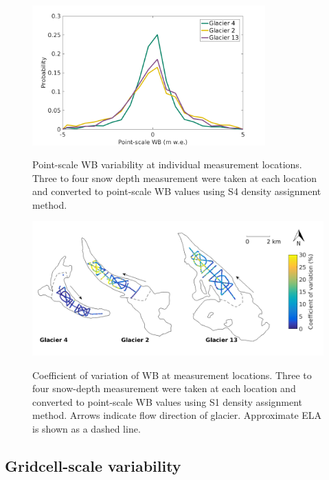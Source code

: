 \documentclass{sfuthesis}
\begin{document}
{\begin{figure}[H]
	\centering
	\includegraphics[width =0.8\textwidth]{SWEvarOneLocHIST.png}\\
	\caption[Point-scale WB variability at individual measurement locations]{Point-scale WB variability at individual measurement locations. Three to four snow depth measurement were taken at each location and converted to point-scale WB values using S4 density assignment method.}
	\label{fig:SWEvar_oneloc_hist}
\end{figure}

\begin{figure}[H]
	\centering
	\includegraphics[width =\textwidth]{Map_pointstd.png}\\
	\caption[Coefficient of variation of WB at measurement locations]{Coefficient of variation of WB at measurement locations. Three to four snow-depth measurement were taken at each location and converted to point-scale WB values using S1 density assignment method. Arrows indicate flow direction of glacier. Approximate ELA is shown as a dashed line.}
	\label{fig:SWEvar_oneloc_map}
\end{figure}

\subsection{Gridcell-scale variability}

}
\end{document}
